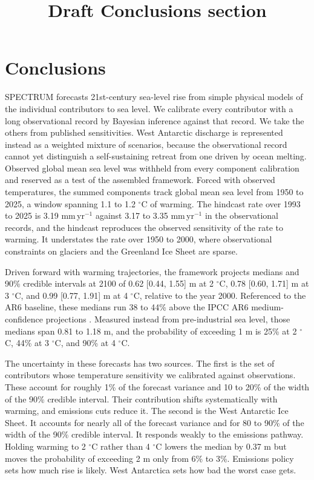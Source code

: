 \documentclass[11pt]{article}
\title{Draft Conclusions section}
\author{}
\date{}
\begin{document}
\maketitle


\section{Conclusions}

SPECTRUM forecasts 21st-century sea-level rise from simple physical models of the individual contributors to sea level. We calibrate every contributor with a long observational record by Bayesian inference against that record. We take the others from published sensitivities. West Antarctic discharge is represented instead as a weighted mixture of scenarios, because the observational record cannot yet distinguish a self-sustaining retreat from one driven by ocean melting. Observed global mean sea level was withheld from every component calibration and reserved as a test of the assembled framework. Forced with observed temperatures, the summed components track global mean sea level from 1950 to 2025, a window spanning 1.1 to 1.2 $^\circ$C of warming. The hindcast rate over 1993 to 2025 is 3.19 mm\,yr$^{-1}$ against 3.17 to 3.35 mm\,yr$^{-1}$ in the observational records, and the hindcast reproduces the observed sensitivity of the rate to warming. It understates the rate over 1950 to 2000, where observational constraints on glaciers and the Greenland Ice Sheet are sparse.

Driven forward with warming trajectories, the framework projects medians and 90\% credible intervals at 2100 of 0.62 [0.44, 1.55] m at 2 $^\circ$C, 0.78 [0.60, 1.71] m at 3 $^\circ$C, and 0.99 [0.77, 1.91] m at 4 $^\circ$C, relative to the year 2000. Referenced to the AR6 baseline, these medians run 38 to 44\% above the IPCC AR6 medium-confidence projections \citep{Fox-Kemper2021}. Measured instead from pre-industrial sea level, those medians span 0.81 to 1.18 m, and the probability of exceeding 1 m is 25\% at 2 $^\circ$C, 44\% at 3 $^\circ$C, and 90\% at 4 $^\circ$C.

The uncertainty in these forecasts has two sources. The first is the set of contributors whose temperature sensitivity we calibrated against observations. These account for roughly 1\% of the forecast variance and 10 to 20\% of the width of the 90\% credible interval. Their contribution shifts systematically with warming, and emissions cuts reduce it. The second is the West Antarctic Ice Sheet. It accounts for nearly all of the forecast variance and for 80 to 90\% of the width of the 90\% credible interval. It responds weakly to the emissions pathway. Holding warming to 2 $^\circ$C rather than 4 $^\circ$C lowers the median by 0.37 m but moves the probability of exceeding 2 m only from 6\% to 3\%. Emissions policy sets how much rise is likely. West Antarctica sets how bad the worst case gets.
\end{document}
